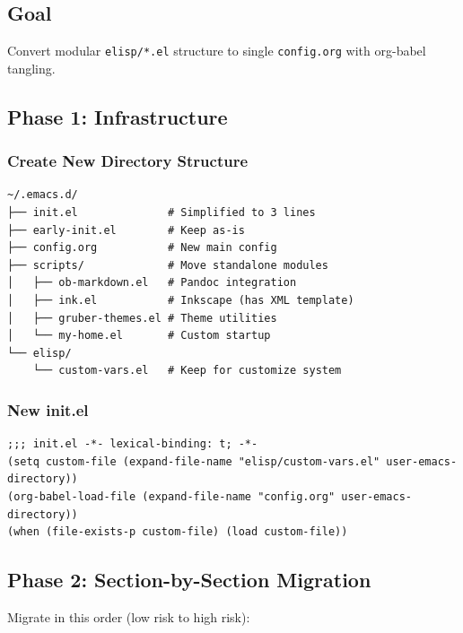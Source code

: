\documentclass[11pt]{article}
\begin{document}
\subsection{Goal}
\label{sec:orgb65b1fb}

Convert modular \texttt{elisp/*.el} structure to single \texttt{config.org} with org-babel tangling.
\subsection{Phase 1: Infrastructure}
\label{sec:orgdc9fe9c}

\subsubsection{Create New Directory Structure}
\label{sec:orgc699da8}

\begin{verbatim}
~/.emacs.d/
├── init.el              # Simplified to 3 lines
├── early-init.el        # Keep as-is
├── config.org           # New main config
├── scripts/             # Move standalone modules
│   ├── ob-markdown.el   # Pandoc integration
│   ├── ink.el           # Inkscape (has XML template)
│   ├── gruber-themes.el # Theme utilities
│   └── my-home.el       # Custom startup
└── elisp/
    └── custom-vars.el   # Keep for customize system
\end{verbatim}
\subsubsection{New init.el}
\label{sec:org3316fec}

\begin{verbatim}
;;; init.el -*- lexical-binding: t; -*-
(setq custom-file (expand-file-name "elisp/custom-vars.el" user-emacs-directory))
(org-babel-load-file (expand-file-name "config.org" user-emacs-directory))
(when (file-exists-p custom-file) (load custom-file))
\end{verbatim}
\subsection{Phase 2: Section-by-Section Migration}
\label{sec:orgca3a9aa}

Migrate in this order (low risk to high risk):
\end{document}
